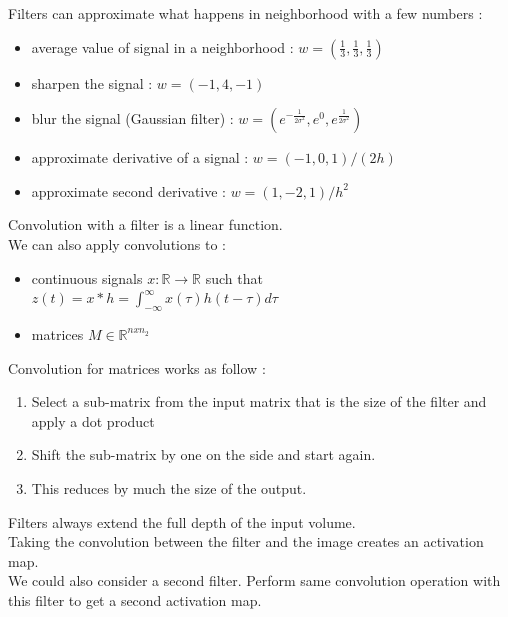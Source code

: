 \documentclass[../main.tex]{subfiles}
\begin{document}
Filters can approximate what happens in neighborhood with a few numbers : \begin{itemize}
    \item average value of signal in a neighborhood : $w = (\frac{1}{3}, \frac{1}{3}, \frac{1}{3})$\\
    \item sharpen the signal : $w = (-1,4,-1)$\\
    \item blur the signal (Gaussian filter) : $w = (e^{-\frac{1}{2\sigma^2}}, e^0, e^{\frac{1}{2\sigma^2}})$\\
    \item approximate derivative of a signal : $w = (-1,0,1)/(2h)$\\
    \item approximate second derivative : $w = (1,-2,1)/h^2$\\
\end{itemize}

Convolution with a filter is a linear function.\\
We can also apply convolutions to : \begin{itemize}
    \item continuous signals $x : \mathbb{R}\rightarrow\mathbb{R}$ such that $z(t) = x*h = \int_{-\infty}^\infty x(\tau) h(t-\tau)d\tau$\\
    \item matrices $M\in \mathbb{R}^{nxn_2}$\\
\end{itemize}

Convolution for matrices works as follow : \\
\begin{enumerate}
    \item Select a sub-matrix from the input matrix that is the size of the filter and apply a dot product\\
    \item Shift the sub-matrix by one on the side and start again. \\
    \item This reduces by much the size of the output.\\
\end{enumerate}

\warning Filters always extend the full depth of the input volume.\\
Taking the convolution between the filter and the image creates an activation map.\\
We could also consider a second filter. Perform same convolution operation with this filter to get a second activation map.\\
\end{document}
